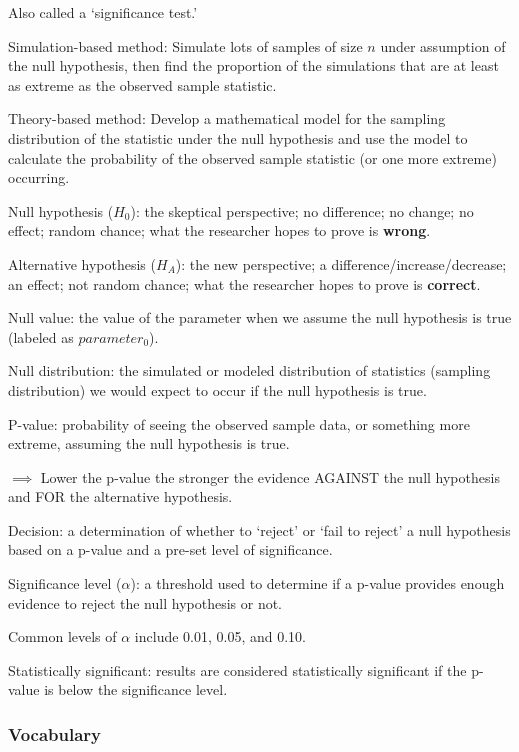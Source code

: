 \documentclass[
]{report}
\newcommand{\rgi}{\hspace{24pt}}  %
\begin{document}
\rgi Also called a `significance test.'

Simulation-based method: Simulate lots of samples of size \(n\) under assumption of the null hypothesis, then find the proportion of the simulations that are at least as extreme as the observed sample statistic.

Theory-based method: Develop a mathematical model for the sampling distribution of the statistic under the null hypothesis and use the model to calculate the probability of the observed sample statistic (or one more extreme) occurring.

Null hypothesis (\(H_0\)): the skeptical perspective; no difference; no change; no effect; random chance; what the researcher hopes to prove is \textbf{wrong}.

Alternative hypothesis (\(H_A\)): the new perspective; a difference/increase/decrease; an effect; not random chance; what the researcher hopes to prove is \textbf{correct}.

Null value: the value of the parameter when we assume the null hypothesis is true (labeled as \(parameter_0\)).

Null distribution: the simulated or modeled distribution of statistics (sampling distribution) we would expect to occur if the null hypothesis is true.

P-value: probability of seeing the observed sample data, or something more extreme, assuming the null hypothesis is true.

\(\implies\) Lower the p-value the stronger the evidence AGAINST the null hypothesis and FOR the alternative hypothesis.

Decision: a determination of whether to `reject' or `fail to reject' a null hypothesis based on a p-value and a pre-set level of significance.

Significance level (\(\alpha\)): a threshold used to determine if a p-value provides enough evidence to reject the null hypothesis or not.

\rgi Common levels of \(\alpha\) include 0.01, 0.05, and 0.10.

Statistically significant: results are considered statistically significant if the p-value is below the significance level.

\hypertarget{vocabulary-15}{%
\subsubsection*{Vocabulary}\label{vocabulary-15}}
\end{document}
